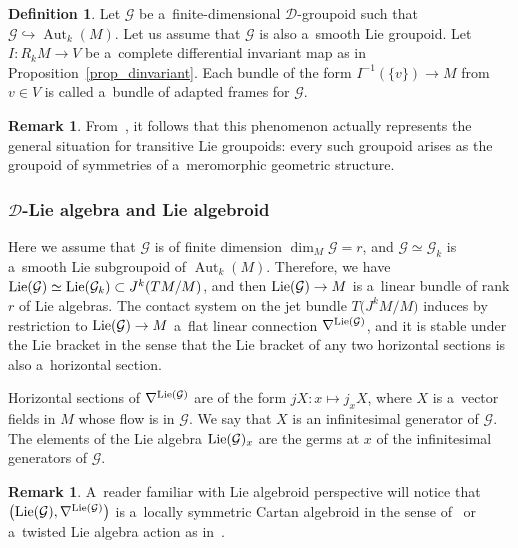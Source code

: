\documentclass[10pt,a4paper]{amsart}
\numberwithin{equation}{section}
\theoremstyle{definition}
\newtheorem{Definition}[Theorem]{Definition}
\newtheorem{Remark}[Theorem]{Remark}
\begin{document}
\begin{Definition}
Let $\mathcal G$ be a~finite-dimensional $\mathcal D$-groupoid such that $\mathcal G\hookrightarrow \operatorname{Aut}_k(M)$. Let us assume that $\mathcal G$ is also a~smooth Lie groupoid. Let $I\colon R_kM \to V$ be a~complete differential invariant map as in Proposition~\ref{prop_dinvariant}. Each bundle of the form $I^{-1}(\{v\})\to M$ from $v\in V$ is called a~bundle of adapted frames for $\mathcal G$.
\end{Definition}

\begin{Remark}
From~\cite{Casale2004SurLG}, it follows that this phenomenon actually represents the general situation for transitive Lie groupoids: every such groupoid arises as the groupoid of symmetries of a~meromorphic geometric structure.
\end{Remark}

\subsubsection[D-Lie algebra and Lie algebroid]{$\boldsymbol{\mathcal D}$-Lie algebra and Lie algebroid}

Here we assume that $\mathcal G$ is of finite dimension $\dim_M\mathcal G = r$, and $\mathcal G \simeq \mathcal G_k$ is a~smooth Lie subgroupoid of $\operatorname{Aut}_k(M)$. Therefore, we have ${\rm Lie}(\mathcal G) \simeq {\rm Lie}(\mathcal G_k) \subset J^k(TM/M)$, and then ${\rm Lie}(\mathcal G)\to M$ is a~linear bundle of rank $r$ of Lie algebras. The contact system on the jet bundle $T\bigl(J^kM/M\bigr)$ induces by restriction to ${\rm Lie}(\mathcal G)\to M$ a~flat linear connection $\nabla^{{\rm Lie}(\mathcal G)}$, and it is stable under the Lie bracket in the sense that the Lie bracket of any two horizontal sections is also a~horizontal section.

Horizontal sections of $\nabla^{{\rm Lie}(\mathcal G)}$ are of the form $jX\colon x\mapsto j_xX$, where $X$ is a~vector fields in $M$ whose flow is in $\mathcal G$. We say that $X$ is an infinitesimal generator of $\mathcal G$. The elements of the Lie algebra ${\rm Lie}(\mathcal G)_x$ are the germs at $x$ of the infinitesimal generators of $\mathcal G$.

\begin{Remark}
A~reader familiar with Lie algebroid perspective will notice that $\bigl({\rm Lie}(\mathcal G), \nabla^{{\rm Lie}(\mathcal G)}\bigr)$ is a~locally symmetric Cartan algebroid in the sense of~\cite[Section~2.5]{blaom2006geometric} or a~twisted Lie algebra action as in~\cite[Section~2.5]{Blaom2016b}.
\end{Remark}
\end{document}
